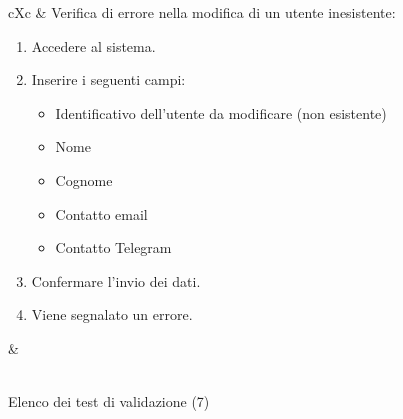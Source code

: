 \begin{table}[H]
\begin{VTtable}[1.7]{\textwidth}{cXc}
        \addtotv & Verifica di errore nella modifica di un utente inesistente:
		\begin{enumerate}
			\item Accedere al sistema.
            \item Inserire i seguenti campi:
                \begin{itemize}
                    \item Identificativo dell'utente da modificare (non esistente)
                    \item Nome
                    \item Cognome
                    \item Contatto email
                    \item Contatto Telegram
                \end{itemize}
            \item Confermare l'invio dei dati.
            \item Viene segnalato un errore.
		\end{enumerate}
		& \TNI \\        
        \bottomrule\\
        \end{VTtable}
	\caption{Elenco dei test di validazione (7)}
\end{table}
